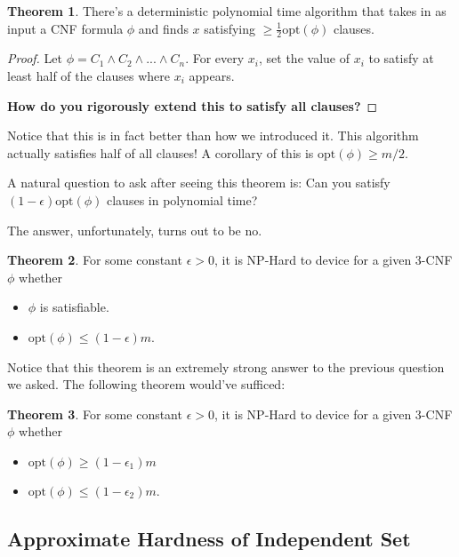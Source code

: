 \documentclass{article}
\theoremstyle{definition}
\newtheorem{theorem}{Theorem}[section]
\newcommand{\opt}{\text{opt}}
\begin{document}
\begin{theorem}
    There's a deterministic polynomial time algorithm that takes
    in as input a CNF formula $\phi$ and finds $x$ satisfying
    $\geq \frac{1}{2} \opt(\phi)$ clauses.
\end{theorem}
\begin{proof}
    Let $\phi = C_{1} \land C_{2} \land ... \land C_{n}$.
    For every $x_{i}$, set the value of $x_{i}$ to satisfy
    at least half of the clauses where $x_{i}$ appears.

    \textbf{How do you rigorously extend this to satisfy all clauses?}
\end{proof}

Notice that this is in fact better than how we introduced it.
This algorithm actually satisfies half of all clauses!
A corollary of this is $\opt(\phi) \geq m/2$.

A natural question to ask after seeing this theorem is:
Can you satisfy $(1 - \epsilon)\opt(\phi)$ clauses in polynomial
time?

The answer, unfortunately, turns out to be no.

\begin{theorem}
    For some constant $\epsilon > 0$, it is
    NP-Hard to device for a given 3-CNF $\phi$ whether

    \begin{itemize}
        \item $\phi$ is satisfiable.
        \item $\opt(\phi) \leq (1 - \epsilon)m$.
    \end{itemize}
\end{theorem}

Notice that this theorem is an extremely strong
answer to the previous question we asked. The following theorem
would've sufficed:

\begin{theorem}
    For some constant $\epsilon > 0$, it is
    NP-Hard to device for a given 3-CNF $\phi$ whether

    \begin{itemize}
        \item $\opt(\phi) \geq (1 - \epsilon_{1})m$
        \item $\opt(\phi) \leq (1 - \epsilon_{2})m$.
    \end{itemize}
\end{theorem}

\newpage

\subsection{Approximate Hardness of Independent Set}
\end{document}
